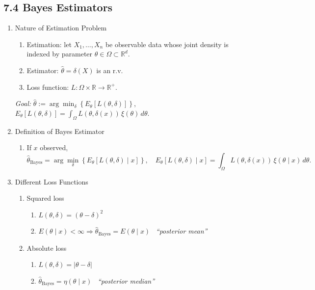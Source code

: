 \documentclass[11pt]{article}
\begin{document}
\subsection*{7.4 Bayes Estimators}
\begin{enumerate}[label=\Roman*.]
  \item Nature of Estimation Problem
  \begin{enumerate}[label=\Alph*.]
    \item Estimation: let $X_{1},\dots,X_{n}$ be observable data whose joint density is indexed by parameter $\theta\in\Omega\subset\mathbb{R}^{d}$.
    \item Estimator: $\hat\theta=\delta(X)$ is an r.v.
    \item Loss function: $L:\Omega\times\mathbb{R}\to\mathbb{R}^{+}$.
  \end{enumerate}
  \textit{Goal:} $\hat\theta:=\arg\min_{\delta}\left\{E_{\theta}\!\left[L(\theta,\delta)\right]\right\}$,\quad
  $E_{\theta}[L(\theta,\delta)]=\int_{\Omega} L(\theta,\delta(x))\,\xi(\theta)\,d\theta$.
  \item Definition of Bayes Estimator
  \begin{enumerate}[label=\Alph*.]
    \item If $x$ observed,
    \[
      \hat\theta_{\text{Bayes}}=\arg\min_{\delta}\left\{E_{\theta}\!\left[L(\theta,\delta)\mid x\right]\right\},
      \quad
      E_{\theta}[L(\theta,\delta)\mid x]=\int_{\Omega}L(\theta,\delta(x))\,\xi(\theta\mid x)\,d\theta.
    \]
  \end{enumerate}
  \item Different Loss Functions
  \begin{enumerate}[label=\Alph*.]
    \item Squared loss
    \begin{enumerate}[label=\arabic*.]
      \item $L(\theta,\delta)=(\theta-\delta)^{2}$
      \item $E(\theta\mid x)<\infty \Rightarrow \hat\theta_{\text{Bayes}}=E(\theta\mid x)$ \ \textit{``posterior mean''}
    \end{enumerate}
    \item Absolute loss
    \begin{enumerate}[label=\arabic*.]
      \item $L(\theta,\delta)=|\theta-\delta|$
      \item $\hat\theta_{\text{Bayes}}=\eta(\theta\mid x)$ \ \textit{``posterior median''}
    \end{enumerate}

\end{enumerate}
\end{enumerate}
\end{document}
